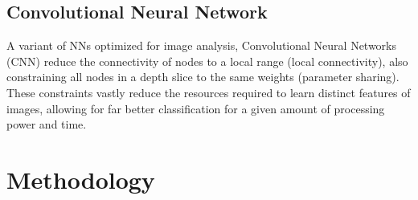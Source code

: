 \documentclass[10pt, hidelinks]{article}
\begin{document}
\subsection*{Convolutional Neural Network}
A variant of NNs optimized for image analysis, Convolutional Neural Networks (CNN) reduce the
connectivity of nodes to a local range (local connectivity), also constraining all nodes in a depth
slice to the same weights (parameter sharing). These constraints vastly reduce the resources
required to learn distinct features of images, allowing for far better classification for a given
amount of processing power and time.

\section*{Methodology}

\end{document}
